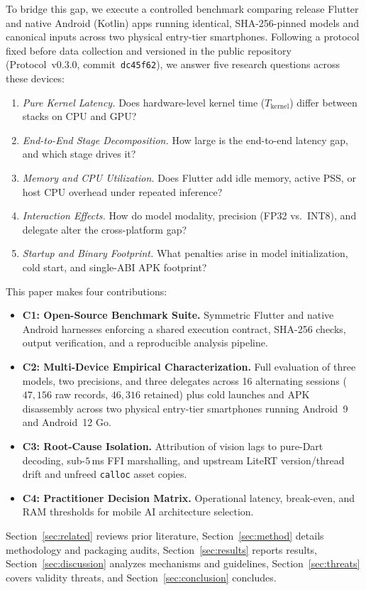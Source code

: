 To bridge this gap, we execute a controlled benchmark comparing release Flutter and native Android (Kotlin) apps running identical, SHA-256-pinned models and canonical inputs across two physical entry-tier smartphones. Following a protocol fixed before data collection and versioned in the public repository (Protocol~v0.3.0, commit~\texttt{dc45f62}), we answer five research questions across these devices:
\begin{enumerate}
    \item[\textbf{RQ1:}] \textit{Pure Kernel Latency.} Does hardware-level kernel time ($T_{\mathrm{kernel}}$) differ between stacks on CPU and GPU?
    \item[\textbf{RQ2:}] \textit{End-to-End Stage Decomposition.} How large is the end-to-end latency gap, and which stage drives it?
    \item[\textbf{RQ3:}] \textit{Memory and CPU Utilization.} Does Flutter add idle memory, active PSS, or host CPU overhead under repeated inference?
    \item[\textbf{RQ4:}] \textit{Interaction Effects.} How do model modality, precision (FP32 vs.\ INT8), and delegate alter the cross-platform gap?
    \item[\textbf{RQ5:}] \textit{Startup and Binary Footprint.} What penalties arise in model initialization, cold start, and single-ABI APK footprint?
\end{enumerate}

This paper makes four contributions:
\begin{itemize}
    \item \textbf{C1: Open-Source Benchmark Suite.} Symmetric Flutter and native Android harnesses enforcing a shared execution contract, SHA-256 checks, output verification, and a reproducible analysis pipeline.
    \item \textbf{C2: Multi-Device Empirical Characterization.} Full evaluation of three models, two precisions, and three delegates across 16 alternating sessions ($47{,}156$ raw records, $46{,}316$ retained) plus cold launches and APK disassembly across two physical entry-tier smartphones running Android~9 and Android~12 Go.
    \item \textbf{C3: Root-Cause Isolation.} Attribution of vision lags to pure-Dart decoding, sub-$5$\,ms FFI marshalling, and upstream LiteRT version/thread drift and unfreed \texttt{calloc} asset copies.
    \item \textbf{C4: Practitioner Decision Matrix.} Operational latency, break-even, and RAM thresholds for mobile AI architecture selection.
\end{itemize}

Section~\ref{sec:related} reviews prior literature, Section~\ref{sec:method} details methodology and packaging audits, Section~\ref{sec:results} reports results, Section~\ref{sec:discussion} analyzes mechanisms and guidelines, Section~\ref{sec:threats} covers validity threats, and Section~\ref{sec:conclusion} concludes.
